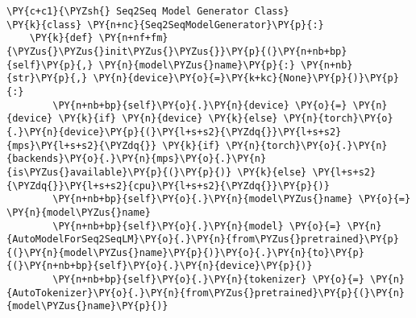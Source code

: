 \documentclass[11pt]{wseas}
\begin{document}
\begin{tcolorbox}[breakable, size=fbox, boxrule=1pt, pad at break*=1mm,colback=cellbackground, colframe=cellborder]
\begin{Verbatim}[commandchars=\\\{\}]
\PY{c+c1}{\PYZsh{} Seq2Seq Model Generator Class}
\PY{k}{class} \PY{n+nc}{Seq2SeqModelGenerator}\PY{p}{:}
    \PY{k}{def} \PY{n+nf+fm}{\PYZus{}\PYZus{}init\PYZus{}\PYZus{}}\PY{p}{(}\PY{n+nb+bp}{self}\PY{p}{,} \PY{n}{model\PYZus{}name}\PY{p}{:} \PY{n+nb}{str}\PY{p}{,} \PY{n}{device}\PY{o}{=}\PY{k+kc}{None}\PY{p}{)}\PY{p}{:}
        \PY{n+nb+bp}{self}\PY{o}{.}\PY{n}{device} \PY{o}{=} \PY{n}{device} \PY{k}{if} \PY{n}{device} \PY{k}{else} \PY{n}{torch}\PY{o}{.}\PY{n}{device}\PY{p}{(}\PY{l+s+s2}{\PYZdq{}}\PY{l+s+s2}{mps}\PY{l+s+s2}{\PYZdq{}} \PY{k}{if} \PY{n}{torch}\PY{o}{.}\PY{n}{backends}\PY{o}{.}\PY{n}{mps}\PY{o}{.}\PY{n}{is\PYZus{}available}\PY{p}{(}\PY{p}{)} \PY{k}{else} \PY{l+s+s2}{\PYZdq{}}\PY{l+s+s2}{cpu}\PY{l+s+s2}{\PYZdq{}}\PY{p}{)}
        \PY{n+nb+bp}{self}\PY{o}{.}\PY{n}{model\PYZus{}name} \PY{o}{=} \PY{n}{model\PYZus{}name}
        \PY{n+nb+bp}{self}\PY{o}{.}\PY{n}{model} \PY{o}{=} \PY{n}{AutoModelForSeq2SeqLM}\PY{o}{.}\PY{n}{from\PYZus{}pretrained}\PY{p}{(}\PY{n}{model\PYZus{}name}\PY{p}{)}\PY{o}{.}\PY{n}{to}\PY{p}{(}\PY{n+nb+bp}{self}\PY{o}{.}\PY{n}{device}\PY{p}{)}
        \PY{n+nb+bp}{self}\PY{o}{.}\PY{n}{tokenizer} \PY{o}{=} \PY{n}{AutoTokenizer}\PY{o}{.}\PY{n}{from\PYZus{}pretrained}\PY{p}{(}\PY{n}{model\PYZus{}name}\PY{p}{)}


\end{Verbatim}
\end{tcolorbox}
\end{document}

